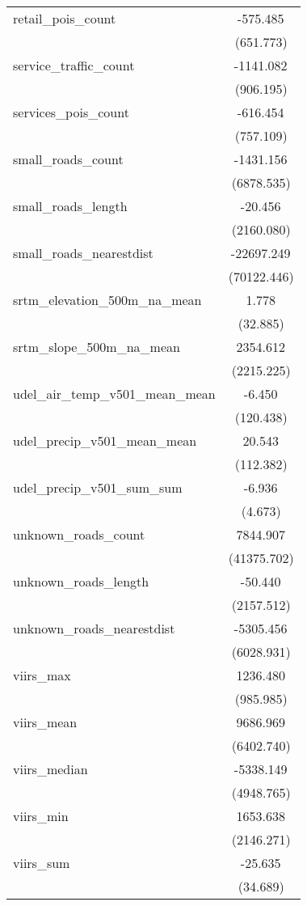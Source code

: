 \begin{table}[!htbp]
\begin{tabular}{@{\extracolsep{5pt}}lc}
 retail_pois_count & -575.485$^{}$ \\
  & (651.773) \\
 service_traffic_count & -1141.082$^{}$ \\
  & (906.195) \\
 services_pois_count & -616.454$^{}$ \\
  & (757.109) \\
 small_roads_count & -1431.156$^{}$ \\
  & (6878.535) \\
 small_roads_length & -20.456$^{}$ \\
  & (2160.080) \\
 small_roads_nearestdist & -22697.249$^{}$ \\
  & (70122.446) \\
 srtm_elevation_500m_na_mean & 1.778$^{}$ \\
  & (32.885) \\
 srtm_slope_500m_na_mean & 2354.612$^{}$ \\
  & (2215.225) \\
 udel_air_temp_v501_mean_mean & -6.450$^{}$ \\
  & (120.438) \\
 udel_precip_v501_mean_mean & 20.543$^{}$ \\
  & (112.382) \\
 udel_precip_v501_sum_sum & -6.936$^{}$ \\
  & (4.673) \\
 unknown_roads_count & 7844.907$^{}$ \\
  & (41375.702) \\
 unknown_roads_length & -50.440$^{}$ \\
  & (2157.512) \\
 unknown_roads_nearestdist & -5305.456$^{}$ \\
  & (6028.931) \\
 viirs_max & 1236.480$^{}$ \\
  & (985.985) \\
 viirs_mean & 9686.969$^{}$ \\
  & (6402.740) \\
 viirs_median & -5338.149$^{}$ \\
  & (4948.765) \\
 viirs_min & 1653.638$^{}$ \\
  & (2146.271) \\
 viirs_sum & -25.635$^{}$ \\
  & (34.689) \\

\end{tabular}
\end{table}
